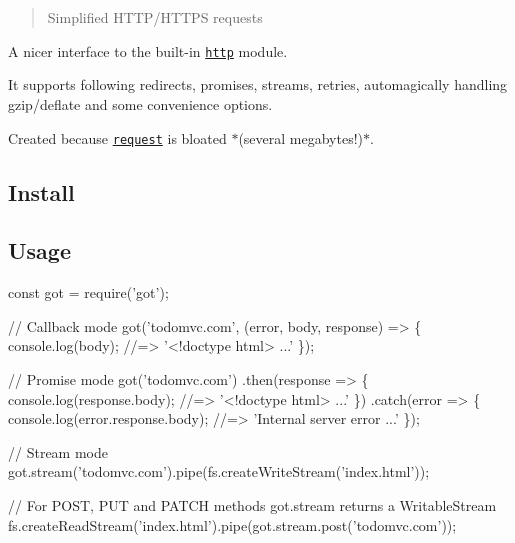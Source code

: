 \section*{~\newline
  ~\newline
 ~\newline
 ~\newline
 }

\begin{quote}
Simplified H\+T\+T\+P/\+H\+T\+T\+PS requests \end{quote}


\href{https://travis-ci.org/sindresorhus/got}{\tt } \href{https://coveralls.io/github/sindresorhus/got?branch=master}{\tt } \href{https://npmjs.com/got}{\tt }

A nicer interface to the built-\/in \href{http://nodejs.org/api/http.html}{\tt {\ttfamily http}} module.

It supports following redirects, promises, streams, retries, automagically handling gzip/deflate and some convenience options.

Created because \href{https://github.com/mikeal/request}{\tt {\ttfamily request}} is bloated $\ast$(several megabytes!)$\ast$.

\subsection*{Install}




\subsection*{Usage}


\begin{DoxyCode}
const got = require('got');

// Callback mode
got('todomvc.com', (error, body, response) => \{
    console.log(body);
    //=> '<!doctype html> ...'
\});

// Promise mode
got('todomvc.com')
    .then(response => \{
        console.log(response.body);
        //=> '<!doctype html> ...'
    \})
    .catch(error => \{
        console.log(error.response.body);
        //=> 'Internal server error ...'
    \});

// Stream mode
got.stream('todomvc.com').pipe(fs.createWriteStream('index.html'));

// For POST, PUT and PATCH methods got.stream returns a WritableStream
fs.createReadStream('index.html').pipe(got.stream.post('todomvc.com'));
\end{DoxyCode}


